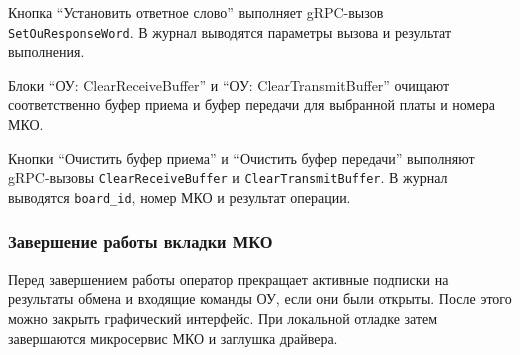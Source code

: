 Кнопка ``Установить ответное слово'' выполняет gRPC-вызов \texttt{SetOuResponseWord}. В журнал выводятся параметры вызова и результат выполнения.

Блоки ``ОУ: ClearReceiveBuffer'' и ``ОУ: ClearTransmitBuffer'' очищают соответственно буфер приема и буфер передачи для выбранной платы и номера МКО.

Кнопки ``Очистить буфер приема'' и ``Очистить буфер передачи'' выполняют gRPC-вызовы \texttt{ClearReceiveBuffer} и \texttt{ClearTransmitBuffer}. В журнал выводятся \texttt{board\_id}, номер МКО и результат операции.

\subsubsection{Завершение работы вкладки МКО}

Перед завершением работы оператор прекращает активные подписки на результаты обмена и входящие команды ОУ, если они были открыты. После этого можно закрыть графический интерфейс. При локальной отладке затем завершаются микросервис МКО и заглушка драйвера.
